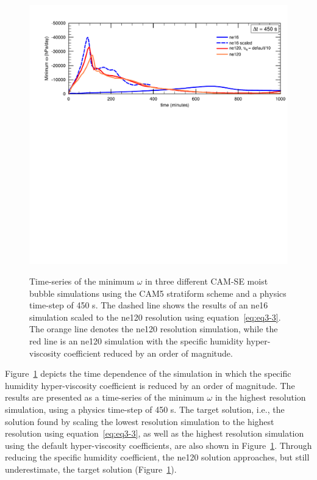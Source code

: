\begin{figure}[t]
\begin{center}
\noindent\includegraphics[width=30pc,angle=0]{chapter3/Figure9_crop.pdf}\\
\end{center}
\caption{Time-series of the minimum $\omega$ in three different CAM-SE moist bubble simulations using the CAM5 stratiform scheme and a physics time-step of 450 s. The dashed line shows the results of an ne16 simulation scaled to the ne120 resolution using equation~\ref{eq:eq3-3}. The orange line denotes the ne120 resolution simulation, while the red line is an ne120 simulation with the specific humidity hyper-viscosity coefficient reduced by an order of magnitude.}
\label{fig:figure3-9}
\end{figure}

Figure~\ref{fig:figure3-9} depicts the time dependence of the simulation in which the specific humidity hyper-viscosity coefficient is reduced by an order of magnitude. The results are presented as a time-series of the minimum $\omega$ in the highest resolution simulation, using a physics time-step of 450 s. The target solution, i.e., the solution found by scaling the lowest resolution simulation to the highest resolution using equation~\ref{eq:eq3-3}, as well as the highest resolution simulation using the default hyper-viscosity coefficients, are also shown in Figure~\ref{fig:figure3-9}. Through reducing the specific humidity coefficient, the ne120 solution approaches, but still underestimate, the target solution (Figure~\ref{fig:figure3-9}).

